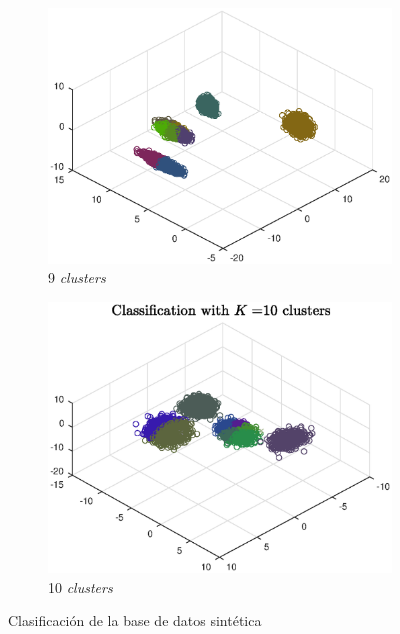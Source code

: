 \documentclass[11pt]{article} %
\begin{document}
\begin{figure}
    \begin{subfigure}[b]{0.435\textwidth}
        \includegraphics[width=\textwidth]{../src/fig/21_9_clusters.eps}
        \caption[]{9 \emph{clusters}}
        \label{fig:21:9c}
    \end{subfigure}
    \quad
    \begin{subfigure}[b]{0.435\textwidth}
        \includegraphics[width=\textwidth]{../src/fig/21_10_clusters.eps}
        \caption[]{10 \emph{clusters}}
        \label{fig:21:10c}
    \end{subfigure}
    \caption{Clasificación de la base de datos sintética}
    \label{fig:21:clusters}
\end{figure}
\end{document}
